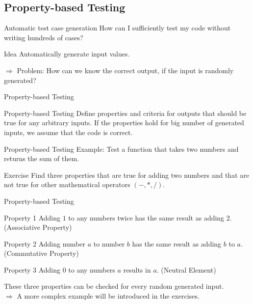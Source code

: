 
\subsection{Property-based Testing}

\begin{frame}{Automatic test case generation}
	How can I sufficiently test my code without writing hundreds of cases?
	\xxx
	\begin{block}{Idea}
		Automatically generate input values.
	\end{block}	

	$\Rightarrow$ Problem: How can we know the correct output, if the input is randomly generated?
\end{frame}



\begin{frame}{Property-based Testing}
	\begin{block}{Property-based Testing}
		Define properties and criteria for outputs that should be true for any arbitrary inputs.
		If the properties hold for big number of generated inputs, we assume that the code is correct.
	\end{block}	

		
\end{frame}

\begin{frame}{Property-based Testing}
	Example: Test a function that takes two numbers and returns the sum of them.
	\xxx
	\begin{block}{Exercise}
		Find three properties that are true for adding two numbers and that are not true for other mathematical operators $(-,*,/)$.
	\end{block}	
\end{frame}


\begin{frame}{Property-based Testing}
	
	\begin{block}{Property 1}
		Adding $1$ to any numbers twice has the same result as adding $2$. (Associative Property)
	\end{block}	

	\begin{block}{Property 2}
		Adding number $a$ to number $b$ has the same result as adding $b$ to $a$. (Commutative Property)
	\end{block}	
	
	\begin{block}{Property 3}
		Adding $0$ to any numbers $a$ results in $a$. (Neutral Element)
	\end{block}	
	\xxx
	These three properties can be checked for every random generated input.\\
	
	$\Rightarrow$ A more complex example will be introduced in the exercises.

		
\end{frame}
